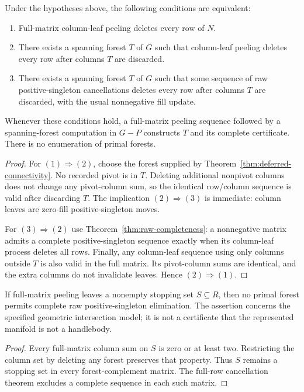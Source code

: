 \begin{theorem}
\label{thm:all-primal-forests}
Under the hypotheses above, the following conditions are equivalent:
\begin{enumerate}
\item Full-matrix column-leaf peeling deletes every row of $N$.
\item There exists a spanning forest $T$ of $G$ such that column-leaf
peeling deletes every row after columns $T$ are discarded.
\item There exists a spanning forest $T$ of $G$ such that some sequence of
raw positive-singleton cancellations deletes every row after columns $T$
are discarded, with the usual nonnegative fill update.
\end{enumerate}
Whenever these conditions hold, a full-matrix peeling sequence followed by
a spanning-forest computation in $G-P$ constructs $T$ and its complete
certificate.  There is no enumeration of primal forests.
\end{theorem}
\begin{proof}
For $(1)\Rightarrow(2)$, choose the forest supplied by
Theorem~\ref{thm:deferred-connectivity}.  No recorded pivot is in $T$.
Deleting additional nonpivot columns does not change any pivot-column sum,
so the identical row/column sequence is valid after discarding $T$.
The implication $(2)\Rightarrow(3)$ is immediate: column leaves are
zero-fill positive-singleton moves.

For $(3)\Rightarrow(2)$ use Theorem~\ref{thm:raw-completeness}: a nonnegative matrix admits a complete
positive-singleton sequence exactly when its column-leaf process deletes
all rows.  Finally, any column-leaf sequence using only columns outside
$T$ is also valid in the full matrix.  Its pivot-column sums are identical,
and the extra columns do not invalidate leaves.  Hence $(2)\Rightarrow(1)$.
\end{proof}

\begin{corollary}
\label{cor:all-forests-obstruction}
If full-matrix peeling leaves a nonempty stopping set $S\subseteq R$, then
no primal forest permits complete raw positive-singleton elimination.
The assertion concerns the specified geometric intersection model; it is
not a certificate that the represented manifold is not a handlebody.
\end{corollary}
\begin{proof}
Every full-matrix column sum on $S$ is zero or at least two.  Restricting
the column set by deleting any forest preserves that property.  Thus $S$
remains a stopping set in every forest-complement matrix.  The full-row
cancellation theorem excludes a complete sequence in each such matrix.
\end{proof}

